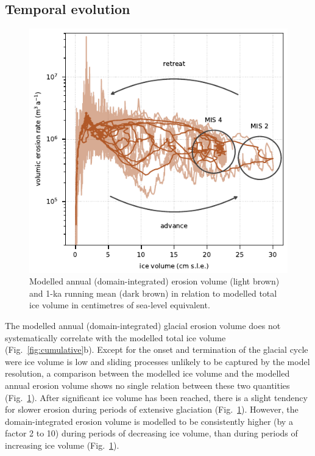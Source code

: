 \documentclass[esurf, manuscript]{copernicus}
\begin{document}
\subsection{Temporal evolution}

    \begin{figure}
      \centerline{\includegraphics{alpero_evolution}}
      \caption{%
        Modelled annual (domain-integrated) erosion volume (light brown) and 1-ka
        running mean (dark brown) in relation to modelled total ice volume in
        centimetres of sea-level equivalent.}
      \label{fig:evolution}
    \end{figure}

    The modelled annual (domain-integrated) glacial erosion volume
    does not systematically correlate with the modelled total ice volume
    (Fig.~\ref{fig:cumulative}b). Except for the onset and termination of the
    glacial cycle were ice volume is low and sliding processes unlikely to be
    captured by the model resolution, a comparison between the modelled ice
    volume and the modelled annual erosion volume shows no single relation
    between these two quantities (Fig.~\ref{fig:evolution}). After significant
    ice volume has been reached, there is a slight tendency for slower erosion
    during periods of extensive glaciation (Fig.~\ref{fig:evolution}). However,
    the domain-integrated erosion volume is modelled to be consistently higher
    (by a factor 2 to 10) during periods of decreasing ice volume, than during
    periods of increasing ice volume (Fig.~\ref{fig:evolution}).
\end{document}
